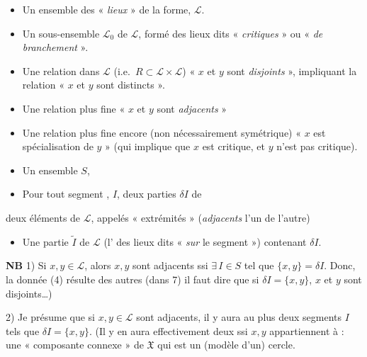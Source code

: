 \documentclass[11pt,a4paper]{article}
\begin{document}
\begin{itemize}
  \item[(1)] Un ensemble des « \emph{lieux} » de la forme, $\mathcal{L}$.
  \item[(2)] Un sous-ensemble $\mathcal{L}_0$ de $\mathcal{L}$, formé des lieux dits « \emph{critiques} » ou « \emph{de branchement} ».
  \item[3)] Une relation  dans $\mathcal{L}$ (i.e.\ $R \subset \mathcal{L} \times \mathcal{L}$) « $x$ et $y$ sont \emph{disjoints} », impliquant la relation « $x$ et $y$ sont distincts ».
  \item[4)] Une relation  plus fine « $x$ et $y$ sont \emph{adjacents} »
  \item[(5)] Une  \struck{\ill{}}  relation plus fine encore  (non nécessairement symétrique) « $x$ \struck{\ill{}} est spécialisation de $y$ » (qui implique que $x$ est critique, et $y$ n'est pas critique).
  \item[(6)] Un ensemble $S$,  
  \item[(7)]  Pour tout segment \struck{\ill{}}, $I$, deux parties $\delta I$ de
\end{itemize}

deux éléments de $\mathcal{L}$, appelés « extrémités »  (\emph{adjacents} l'un de l'autre)
\begin{itemize}
  \item[(8)] Une partie $\widetilde{I}$ de $\mathcal{L}$ (l' des lieux dits \struck{\ill{}} « \emph{sur} le segment ») contenant $\delta I$.
\end{itemize}

\textbf{NB} 1) Si $x, y \in \mathcal{L}$, alors $x, y$ sont adjacents ssi $\exists\, I \in S$ tel que $\{x,y\} = \delta I$. Donc, la donnée (4)  résulte des autres (dans 7) il faut dire que si $\delta I = \{x,y\}$, $x$ et $y$ sont disjoints\ldots)

2) Je présume que si $x, y \in \mathcal{L}$ sont adjacents, il y aura au plus deux segments $I$ tels que $\delta I = \{x,y\}$. (Il y en aura effectivement deux ssi $x, y$ appartiennent à  : une « composante connexe » de $\mathfrak{X}$ qui est un (modèle d'un) cercle.
\end{document}

